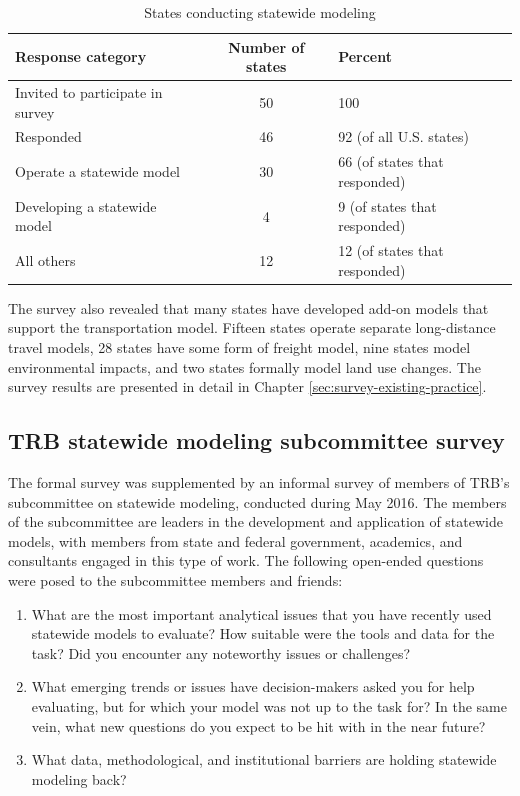 \begin{table}  %
\centering
\caption{States conducting statewide modeling}
\label{tab:states-conducting}
\begin{tabular}{lcl}
\hline
Response category & Number of states & Percent \\
\hline
Invited to participate in survey & 50 & 100 \\
Responded & 46 & 92 (of all U.S. states) \\
\hline
Operate a statewide model & 30 & 66 (of states that responded) \\
Developing a statewide model & 4 & 9 (of states that responded) \\
All others & 12 & 12 (of states that responded) \\
\hline
\end{tabular}
\end{table}

The survey also revealed that many states have developed add-on models that support the transportation model. Fifteen states operate separate long-distance travel models, 28 states have some form of freight model, nine states model environmental impacts, and two states formally model land use changes. The survey results are presented in detail in Chapter \ref{sec:survey-existing-practice}.

\subsection{TRB statewide modeling subcommittee survey}

The formal survey was supplemented by an informal survey of members of TRB's subcommittee on statewide modeling, conducted during May 2016. The members of the subcommittee are leaders in the development and application of statewide models, with members from state and federal government, academics, and consultants engaged in this type of work. The following open-ended questions were posed to the subcommittee members and friends:
\begin{enumerate}
\item What are the most important analytical issues that you have recently used statewide models to evaluate? How suitable were the tools and data for the task? Did you encounter any noteworthy issues or challenges? 
\item What emerging trends or issues have decision-makers asked you for help evaluating, but for which your model was not up to the task for? In the same vein, what new questions do you expect to be hit with in the near future?
\item What data, methodological, and institutional barriers are holding statewide modeling back?
\end{enumerate}


